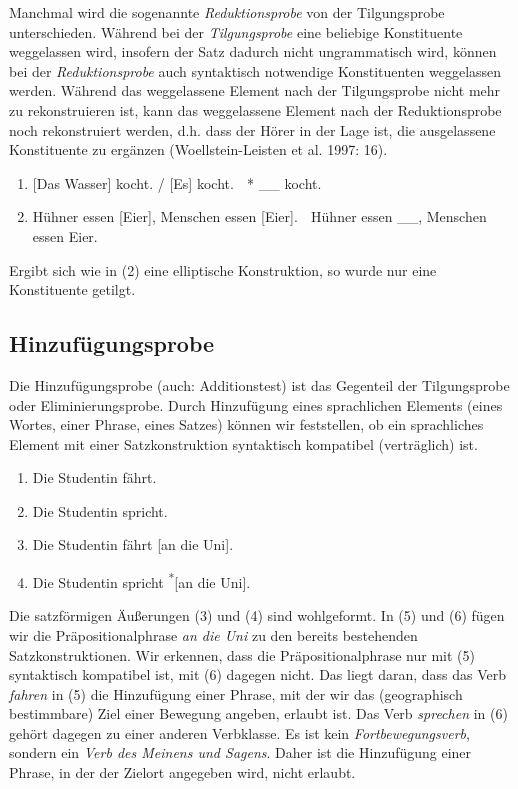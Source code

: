 \documentclass[
  letterpaper,
  DIV=11,
  numbers=noendperiod]{scrreprt}
\providecommand{\tightlist}{%
  \setlength{\itemsep}{0pt}\setlength{\parskip}{0pt}}\usepackage{longtable,booktabs,array}
\begin{document}
Manchmal wird die sogenannte \emph{Reduktionsprobe} von der
Tilgungsprobe unterschieden. Während bei der \emph{Tilgungsprobe} eine
beliebige Konstituente weggelassen wird, insofern der Satz dadurch nicht
ungrammatisch wird, können bei der \emph{Reduktionsprobe} auch
syntaktisch notwendige Konstituenten weggelassen werden. Während das
weggelassene Element nach der Tilgungsprobe nicht mehr zu rekonstruieren
ist, kann das weggelassene Element nach der Reduktionsprobe noch
rekonstruiert werden, d.h. dass der Hörer in der Lage ist, die
ausgelassene Konstituente zu ergänzen (Woellstein-Leisten et al. 1997:
16).

\begin{enumerate}
\def\labelenumi{(\arabic{enumi})}
\tightlist
\item
  {[}Das Wasser{]} kocht. / {[}Es{]} kocht.  * \_\_ kocht.
\item
  Hühner essen {[}Eier{]}, Menschen essen {[}Eier{]}.  Hühner essen
  \_\_, Menschen essen Eier.
\end{enumerate}

Ergibt sich wie in (2) eine elliptische Konstruktion, so wurde nur eine
Konstituente getilgt.

\hypertarget{hinzufuxfcgungsprobe}{%
\subsection{Hinzufügungsprobe}\label{hinzufuxfcgungsprobe}}

Die Hinzufügungsprobe (auch: Additionstest) ist das Gegenteil der
Tilgungsprobe oder Eliminierungsprobe. Durch Hinzufügung eines
sprachlichen Elements (eines Wortes, einer Phrase, eines Satzes) können
wir feststellen, ob ein sprachliches Element mit einer Satzkonstruktion
syntaktisch kompatibel (verträglich) ist.

\begin{enumerate}
\def\labelenumi{(\arabic{enumi})}
\setcounter{enumi}{2}
\tightlist
\item
  Die Studentin fährt.\\
\item
  Die Studentin spricht.\\
\item
  Die Studentin fährt {[}an die Uni{]}.\\
\item
  Die Studentin spricht \textsuperscript{*}{[}an die Uni{]}.
\end{enumerate}

Die satzförmigen Äußerungen (3) und (4) sind wohlgeformt. In (5) und (6)
fügen wir die Präpositionalphrase \emph{an die Uni} zu den bereits
bestehenden Satzkonstruktionen. Wir erkennen, dass die
Präpositionalphrase nur mit (5) syntaktisch kompatibel ist, mit (6)
dagegen nicht. Das liegt daran, dass das Verb \emph{fahren} in (5) die
Hinzufügung einer Phrase, mit der wir das (geographisch bestimmbare)
Ziel einer Bewegung angeben, erlaubt ist. Das Verb \emph{sprechen} in
(6) gehört dagegen zu einer anderen Verbklasse. Es ist kein
\emph{Fortbewegungsverb}, sondern ein \emph{Verb des Meinens und
Sagens}. Daher ist die Hinzufügung einer Phrase, in der der Zielort
angegeben wird, nicht erlaubt.
\end{document}
